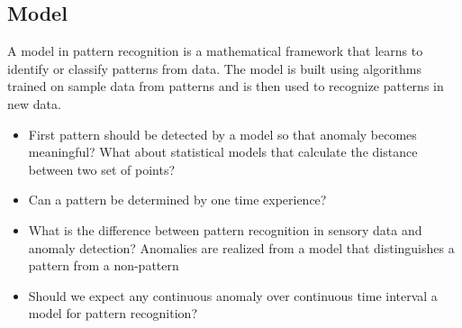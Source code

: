     \subsection{Model}
    A model in pattern recognition is a mathematical framework that learns to identify or classify patterns from data. The model is built using algorithms trained on sample data from patterns and is then used to recognize patterns in new data.
    \begin{itemize}
        \item First pattern should be detected by a model so that anomaly becomes meaningful? What about statistical models that calculate the distance between two set of points?
        \item Can a pattern be determined by one time experience?
    \end{itemize}
    \begin{itemize}
        \item What is the difference between pattern recognition in sensory data and anomaly detection? Anomalies are realized from a model that distinguishes a pattern from a non-pattern
        \item Should we expect any continuous anomaly over continuous time interval a model for pattern recognition?
    \end{itemize}